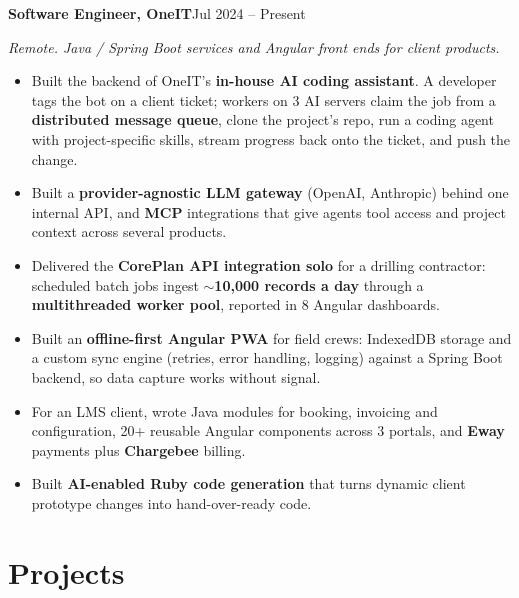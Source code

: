 \documentclass[10pt, letterpaper]{article}
\newenvironment{highlights}{
    \begin{itemize}[
        topsep=0.06 cm,
        parsep=0.04 cm,
        partopsep=0pt,
        itemsep=0pt,
        leftmargin=0.4 cm
    ]
}{
    \end{itemize}
}
\newcommand{\entry}[2]{\textbf{#1}\hfill{#2}\par}
\newcommand{\sub}[1]{{\small\textit{#1}}\par}
\begin{document}
    \entry{Software Engineer, OneIT}{Jul 2024 -- Present}
    \sub{Remote. Java / Spring Boot services and Angular front ends for client products.}
    \begin{highlights}
        \item Built the backend of OneIT's \textbf{in-house AI coding assistant}. A developer tags the bot on a client
              ticket; workers on 3 AI servers claim the job from a \textbf{distributed message queue}, clone the
              project's repo, run a coding agent with project-specific skills, stream progress back onto the
              ticket, and push the change.
        \item Built a \textbf{provider-agnostic LLM gateway} (OpenAI, Anthropic) behind one internal API, and
              \textbf{MCP} integrations that give agents tool access and project context across several products.
        \item Delivered the \textbf{CorePlan API integration solo} for a drilling contractor: scheduled batch jobs
              ingest \textbf{$\sim$10,000 records a day} through a \textbf{multithreaded worker pool}, reported in
              8 Angular dashboards.
        \item Built an \textbf{offline-first Angular PWA} for field crews: IndexedDB storage and a custom sync
              engine (retries, error handling, logging) against a Spring Boot backend, so data capture works
              without signal.
        \item For an LMS client, wrote Java modules for booking, invoicing and configuration, 20+ reusable Angular
              components across 3 portals, and \textbf{Eway} payments plus \textbf{Chargebee} billing.
        \item Built \textbf{AI-enabled Ruby code generation} that turns dynamic client prototype changes into
              hand-over-ready code.
    \end{highlights}

    \section{Projects}
\end{document}
